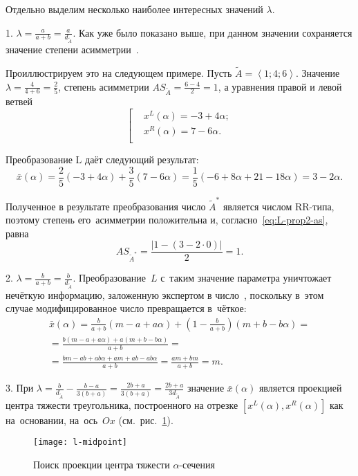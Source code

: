Отдельно выделим несколько наиболее интересных значений $\lambda$.

1. $\displaystyle \lambda =\frac{a}{a+b}=\frac{a}{d_{\tilde A}}$. Как уже было показано выше, при данном значении сохраняется значение степени асимметрии~\cite{VSU-1}.

Проиллюстрируем это на следующем примере. Пусть $\tilde{A}=\left\langle 1;4;6 \right\rangle $. Значение $\displaystyle \lambda =\frac{4}{4+6}=\frac{2}{5}$, степень асимметрии $\displaystyle AS_{\tilde A}=\frac{6-4}{2}=1$, а уравнения правой и левой ветвей
\begin{equation*}
  \left[ \begin{aligned}
    & {{x}^{L}}\left( \alpha  \right)=-3+4\alpha; \\ 
    & {{x}^{R}}\left( \alpha  \right)=7-6\alpha. \\ 
  \end{aligned} \right.
\end{equation*}

Преобразование L даёт следующий результат:
\begin{equation*}
  \bar{x}\left( \alpha  \right)=\frac{2}{5}\left( -3+4\alpha  \right)+\frac{3}{5}\left( 7-6\alpha  \right)=\frac{1}{5}\left( -6+8\alpha +21-18\alpha  \right)=3-2\alpha.
\end{equation*}

Полученное в результате преобразования число $\tilde A^{*}$ является числом RR-типа, поэтому степень его~асимметрии положительна и, согласно~\eqref{eq:L-prop2-as}, равна
\begin{equation*}
  AS_{\tilde A^{*}}=\frac{\left| 1-\left( 3-2\cdot 0 \right) \right|}{2}=1.
\end{equation*}

2. $\displaystyle \lambda =\frac{b}{a+b}=\frac{b}{d_{\tilde A}}$. Преобразование~$L$ с~таким значение параметра уничтожает нечёткую информацию, заложенную экспертом в число~\cite{Vorontsov_PI}, поскольку в~этом случае модифицированное число превращается в~чёткое:
\begin{gather*}
  \bar{x}\left( \alpha  \right)=\frac{b}{a+b}\left( m-a+a\alpha \right)+\left( 1-\frac{b}{a+b} \right)\left( m+b-b\alpha \right)={}\\
  {}=\frac{b\left( m-a+a\alpha  \right)+a\left( m+b-b\alpha \right)}{a+b}={} \\ 
  {}=\frac{bm-ab+ab\alpha +am+ab-ab\alpha }{a+b}=\frac{am+bm}{a+b}=m. 
\end{gather*}

3. При $\displaystyle \lambda =\frac{b}{d_{\tilde A}}-\frac{b-a}{3\left( b+a \right)}=\frac{2b+a}{3\left( b+a \right)}=\frac{2b+a}{3d_{\tilde A}}$ значение $\bar{x}(\alpha )$ является проекцией центра тяжести треугольника, построенного на отрезке $\left[ {{x}^{L}}(\alpha ), x^R\left(\alpha \right) \right]$ как на~основании, на~ось~$Ox$ (см.~рис.~\ref{fig:l-midpoint}).
\begin{figure}[h!]
  \centering
  {
    \texttt{[image: l-midpoint]}
    \caption{Поиск проекции центра тяжести $\alpha$-сечения}
    \label{fig:l-midpoint}
  }
\end{figure}

